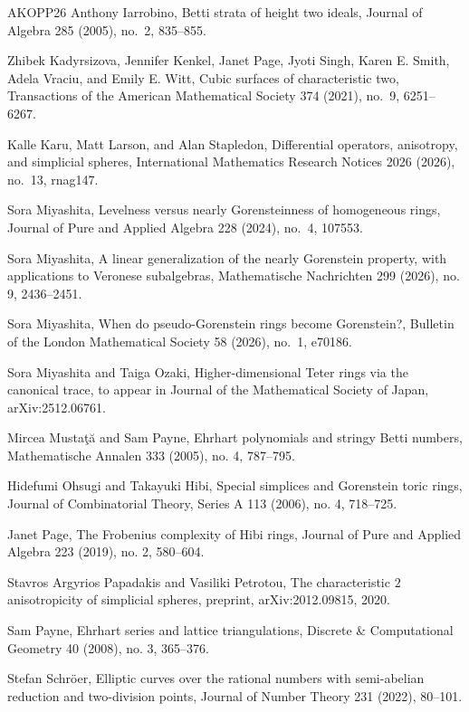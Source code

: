 \documentclass[a4paper,11pt]{amsart}
\theoremstyle{definition}
\begin{document}
\begin{thebibliography}{AKOPP26}
 Anthony Iarrobino, Betti strata of height two ideals, Journal of Algebra 285 (2005), no.~2, 835--855.

 Zhibek Kadyrsizova, Jennifer Kenkel, Janet Page, Jyoti Singh, Karen E. Smith, Adela Vraciu, and Emily E. Witt, Cubic surfaces of characteristic two, Transactions of the American Mathematical Society 374 (2021), no.~9, 6251--6267.

 Kalle Karu, Matt Larson, and Alan Stapledon, Differential operators, anisotropy, and simplicial spheres, International Mathematics Research Notices 2026 (2026), no.~13, rnag147.

 Sora Miyashita, Levelness versus nearly Gorensteinness of homogeneous rings, Journal of Pure and Applied Algebra 228 (2024), no.~4, 107553.

 Sora Miyashita, A linear generalization of the nearly Gorenstein property, with applications to Veronese subalgebras, Mathematische Nachrichten 299 (2026), no. 9, 2436--2451.

 Sora Miyashita, When do pseudo-Gorenstein rings become Gorenstein?, Bulletin of the London Mathematical Society 58 (2026), no.~1, e70186.

 Sora Miyashita and Taiga Ozaki, Higher-dimensional Teter rings via the canonical trace, to appear in Journal of the Mathematical Society of Japan, arXiv:2512.06761.

 Mircea Musta\c{t}\u{a} and Sam Payne, Ehrhart polynomials and stringy Betti numbers, Mathematische Annalen 333 (2005), no. 4, 787--795.

 Hidefumi Ohsugi and Takayuki Hibi, Special simplices and Gorenstein toric rings, Journal of Combinatorial Theory, Series A 113 (2006), no. 4, 718--725.

 Janet Page, The Frobenius complexity of Hibi rings, Journal of Pure and Applied Algebra 223 (2019), no. 2, 580--604.

 Stavros Argyrios Papadakis and Vasiliki Petrotou, The characteristic $2$ anisotropicity of simplicial spheres, preprint, arXiv:2012.09815, 2020.

 Sam Payne, Ehrhart series and lattice triangulations, Discrete \& Computational Geometry 40 (2008), no. 3, 365--376.

 Stefan Schr\"oer, Elliptic curves over the rational numbers with semi-abelian reduction and two-division points, Journal of Number Theory 231 (2022), 80--101.


\end{thebibliography}
\end{document}
